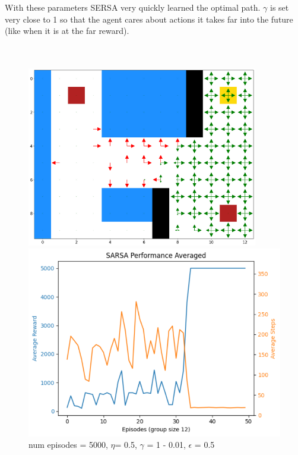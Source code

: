 \documentclass[12pt]{article}
\begin{document}
With these parameters SERSA very quickly learned the optimal path. $\gamma$ is set very close to 1 so that the agent cares about actions it takes far into the future (like when it is at the far reward).
\\ \\ \\

\begin{figure}
  \centering
\begin{minipage}{.28\textwidth}
  \includegraphics[width=0.9\textwidth]{3 Q plot.png}
  \caption{  num episodes = 5000, $\eta$= 0.5, $\gamma$ = 1 - 0.01, $\epsilon$ = 0.5}
\end{minipage}%
\begin{minipage}{.32\textwidth}
  \centering
  \includegraphics[width=1\textwidth]{10 performance plot.png}
\end{minipage}
\end{figure}
\end{document}
